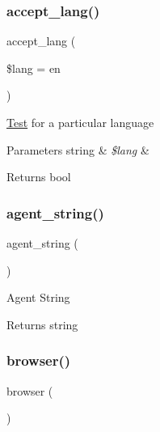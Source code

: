 \subsubsection{\texorpdfstring{accept\+\_\+lang()}{accept\_lang()}}
{\footnotesize\ttfamily accept\+\_\+lang (\begin{DoxyParamCaption}\item[{}]{\$lang = {\ttfamily \textquotesingle{}en\textquotesingle{}} }\end{DoxyParamCaption})}

\mbox{\hyperlink{class_test}{Test}} for a particular language


\begin{DoxyParams}[1]{Parameters}
string & {\em \$lang} & \\
\hline
\end{DoxyParams}
\begin{DoxyReturn}{Returns}
bool 
\end{DoxyReturn}
\mbox{\label{class_c_i___user__agent_a2a75d1ec3cf3f59cdcae64f6afbc8a1b}} 
\subsubsection{\texorpdfstring{agent\+\_\+string()}{agent\_string()}}
{\footnotesize\ttfamily agent\+\_\+string (\begin{DoxyParamCaption}{ }\end{DoxyParamCaption})}

Agent String

\begin{DoxyReturn}{Returns}
string 
\end{DoxyReturn}
\mbox{\label{class_c_i___user__agent_a7dbfb19bfe0682921dcfad5de8dc987c}} 
\subsubsection{\texorpdfstring{browser()}{browser()}}
{\footnotesize\ttfamily browser (\begin{DoxyParamCaption}{ }\end{DoxyParamCaption})}

